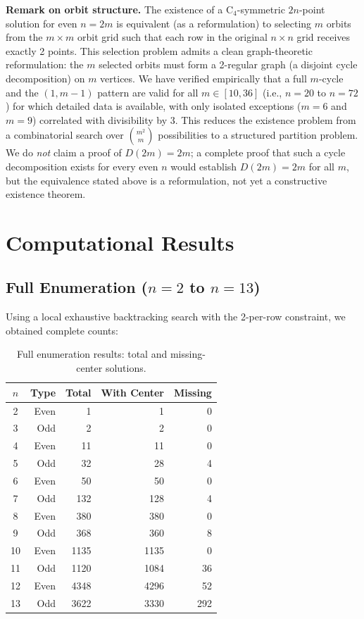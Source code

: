 \documentclass[11pt,a4paper]{article}
\theoremstyle{plain}
\theoremstyle{definition}
\begin{document}
\noindent\textbf{Remark on orbit structure.} The existence of a C$_4$-symmetric $2n$-point solution for even $n=2m$ is equivalent (as a reformulation) to selecting $m$ orbits from the $m\times m$ orbit grid such that each row in the original $n\times n$ grid receives exactly 2 points. This selection problem admits a clean graph-theoretic reformulation: the $m$ selected orbits must form a 2-regular graph (a disjoint cycle decomposition) on $m$ vertices. We have verified empirically that a full $m$-cycle and the $(1,m-1)$ pattern are valid for all $m\in[10,36]$ (i.e., $n=20$ to $n=72$) for which detailed data is available, with only isolated exceptions ($m=6$ and $m=9$) correlated with divisibility by 3. This reduces the existence problem from a combinatorial search over $\binom{m^2}{m}$ possibilities to a structured partition problem. We do \emph{not} claim a proof of $D(2m)=2m$; a complete proof that such a cycle decomposition exists for every even $n$ would establish $D(2m)=2m$ for all $m$, but the equivalence stated above is a reformulation, not yet a constructive existence theorem.

\section{Computational Results}
\label{sec:results}

\subsection{Full Enumeration ($n=2$ to $n=13$)}

Using a local exhaustive backtracking search with the 2-per-row constraint, we obtained complete counts:

\begin{table}[H]
\centering
\caption{Full enumeration results: total and missing-center solutions.}
\label{tab:full}
\begin{tabular}{crrrr}
\toprule
$n$ & Type & Total & With Center & Missing \\
\midrule
2 & Even & 1 & 1 & 0\\
3 & Odd & 2 & 2 & 0\\
4 & Even & 11 & 11 & 0\\
5 & Odd & 32 & 28 & 4\\
6 & Even & 50 & 50 & 0\\
7 & Odd & 132 & 128 & 4\\
8 & Even & 380 & 380 & 0\\
9 & Odd & 368 & 360 & 8\\
10 & Even & 1135 & 1135 & 0\\
11 & Odd & 1120 & 1084 & 36\\
12 & Even & 4348 & 4296 & 52\\
13 & Odd & 3622 & 3330 & 292\\
\bottomrule
\end{tabular}
\end{table}
\end{document}

